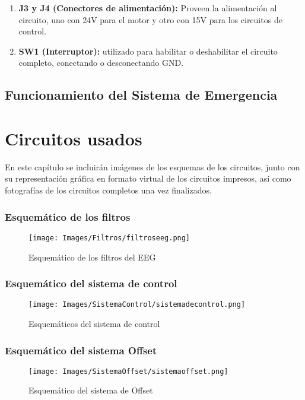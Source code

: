 \documentclass{article}
\begin{document}
\begin{enumerate}
    \item \textbf{J3 y J4 (Conectores de alimentación):} Proveen la alimentación al circuito, uno con 24V para el motor y otro con 15V para los circuitos de control.
    
    \item \textbf{SW1 (Interruptor):}  utilizado para habilitar o deshabilitar el circuito completo, conectando o desconectando GND.
    
\end{enumerate}


\subsection{Funcionamiento del Sistema de Emergencia}



\section{Circuitos usados}
En este capítulo se incluirán imágenes de los esquemas de los circuitos, junto con su representación gráfica en formato virtual de los circuitos impresos, así como fotografías de los circuitos completos una vez finalizados.


\subsubsection{Esquemático de los filtros}
\begin{figure}[H]
    \centering
    \texttt{[image: Images/Filtros/filtroseeg.png]}
    \caption{Esquemático de los filtros del EEG}
\end{figure}

\subsubsection{Esquemático del sistema de control}
\begin{figure}[H]
    \centering
    \texttt{[image: Images/SistemaControl/sistemadecontrol.png]}
    \caption{Esquemáticos del sistema de control}
\end{figure}

\subsubsection{Esquemático del sistema Offset}
\begin{figure}[H]
    \centering
    \texttt{[image: Images/SistemaOffset/sistemaoffset.png]}
    \caption{Esquemático del sistema de Offset}
\end{figure}
\end{document}
